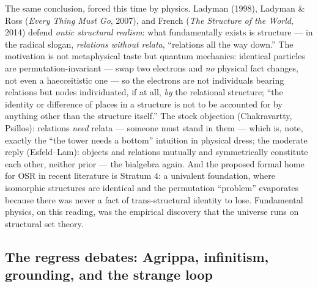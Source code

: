 \documentclass[11pt]{article}
\theoremstyle{plain}
\theoremstyle{definition}
\theoremstyle{remark}
\begin{document}
The same conclusion, forced this time by physics. Ladyman (1998), Ladyman \& Ross (\emph{Every Thing Must Go}, 2007), and French (\emph{The Structure of the World}, 2014) defend \emph{ontic structural realism}: what fundamentally exists is structure --- in the radical slogan, \emph{relations without relata}, ``relations all the way down.'' The motivation is not metaphysical taste but quantum mechanics: identical particles are permutation-invariant --- swap two electrons and \emph{no} physical fact changes, not even a haecceitistic one --- so the electrons are not individuals bearing relations but nodes individuated, if at all, \emph{by} the relational structure; ``the identity or difference of places in a structure is not to be accounted for by anything other than the structure itself.'' The stock objection (Chakravartty, Psillos): relations \emph{need} relata --- someone must stand in them --- which is, note, exactly the ``the tower needs a bottom'' intuition in physical dress; the moderate reply (Esfeld--Lam): objects and relations mutually and symmetrically constitute each other, neither prior --- the bialgebra again. And the proposed formal home for OSR in recent literature is Stratum 4: a univalent foundation, where isomorphic structures are identical and the permutation ``problem'' evaporates because there was never a fact of trans-structural identity to lose. Fundamental physics, on this reading, was the empirical discovery that the universe runs on structural set theory.

\subsection{The regress debates: Agrippa, infinitism, grounding, and the strange loop}
\end{document}
